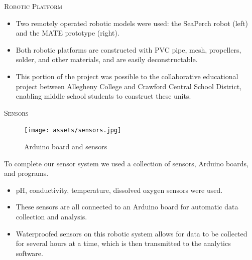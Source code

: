 \documentclass[final,t]{beamer}
\begin{document}
\begin{frame}{}
\begin{columns}
\begin{column}{.5\linewidth}
\begin{block}{\textsc{Robotic Platform}}
                    \begin{itemize}
                    	\item Two remotely operated robotic models were used: the SeaPerch robot (left) and the MATE prototype (right).
                    	\item Both robotic platforms are constructed with PVC pipe, mesh, propellers, solder, and other materials, and are easily deconstructable.
                    	\item This portion of the project was possible to the collaborative educational project between Allegheny College and Crawford Central School District, enabling middle school students to construct these units.
                    \end{itemize}

                    \vspace*{3mm}
                \end{block}
                \begin{block}{\textsc{Sensors}}
                    \vspace*{3mm}

                    \begin{figure}
                        \centering
                        \texttt{[image: assets/sensors.jpg]}
                        \caption{Arduino board and sensors}
                    \end{figure}
                    To complete our sensor system we used a collection of sensors, Arduino boards, and programs.
                    \begin{itemize}
                    	\item pH, conductivity, temperature, dissolved oxygen sensors were used.

                    	\item These sensors are all connected to an Arduino board for automatic data collection and analysis.
                     	\item Waterproofed sensors on this robotic system allows for data to be collected for several hours at a time, which is then transmitted to the analytics software.
                     \end{itemize}

                    \vspace*{3mm}
                \end{block}


\end{column}
\end{columns}
\end{frame}
\end{document}
